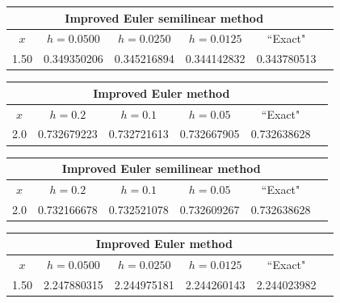 \bigskip

\hspace{.75in}
{\small
\begin{tabular}{|c|r|r|r|r|r|}
\hline
\multicolumn{5}{|c|}{Improved Euler  semilinear method}\\\hline
\multicolumn{1}{|c|}{$x$}&
\multicolumn{1}{|c|}{$h=0.0500$}&
\multicolumn{1}{|c|}{$h=0.0250$}&
\multicolumn{1}{|c|}{$h=0.0125$}&
\multicolumn{1}{|c|}{``Exact"}\\ \hline
1.50 & 0.349350206 & 0.345216894 & 0.344142832 & 0.343780513 \\
\hline
\end{tabular}}

\bigskip

{\small
\begin{tabular}{|c|r|r|r|r|r|}
\hline
\multicolumn{5}{|c|}{Improved Euler method}\\\hline
\multicolumn{1}{|c|}{$x$}&
\multicolumn{1}{|c|}{$h=0.2$}&
\multicolumn{1}{|c|}{$h=0.1$}&
\multicolumn{1}{|c|}{$h=0.05$}&
\multicolumn{1}{|c|}{``Exact"}\\ \hline
2.0 & 0.732679223 & 0.732721613 & 0.732667905 & 0.732638628 \\
\hline
\end{tabular}}

\bigskip

\hspace{.75in}
{\small
\begin{tabular}{|c|r|r|r|r|r|}
\hline
\multicolumn{5}{|c|}{
Improved Euler semilinear method}\\\hline
\multicolumn{1}{|c|}{$x$}&
\multicolumn{1}{|c|}{$h=0.2$}&
\multicolumn{1}{|c|}{$h=0.1$}&
\multicolumn{1}{|c|}{$h=0.05$}&
\multicolumn{1}{|c|}{``Exact"}\\ \hline
2.0 & 0.732166678 & 0.732521078 & 0.732609267 & 0.732638628 \\
\hline
\end{tabular}}

\bigskip

{\small
\begin{tabular}{|c|r|r|r|r|r|}
\hline
\multicolumn{5}{|c|}{Improved Euler method}\\\hline
\multicolumn{1}{|c|}{$x$}&
\multicolumn{1}{|c|}{$h=0.0500$}&
\multicolumn{1}{|c|}{$h=0.0250$}&
\multicolumn{1}{|c|}{$h=0.0125$}&
\multicolumn{1}{|c|}{``Exact"}\\ \hline
1.50 & 2.247880315 & 2.244975181 & 2.244260143 & 2.244023982 \\
\hline
\end{tabular}}

